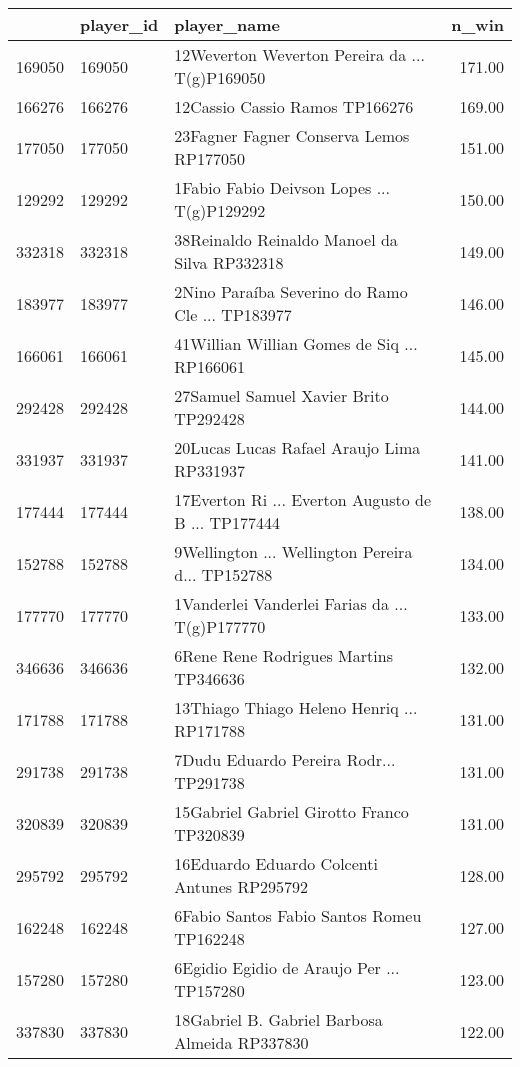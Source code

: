 \begin{table}[ht]
\centering
\begin{tabular}{rllr}
  \hline
 & player\_id & player\_name & n\_win \\ 
  \hline
169050 & 169050 & 12Weverton Weverton Pereira da ... T(g)P169050 & 171.00 \\ 
  166276 & 166276 & 12Cassio Cassio Ramos TP166276 & 169.00 \\ 
  177050 & 177050 & 23Fagner Fagner Conserva Lemos RP177050 & 151.00 \\ 
  129292 & 129292 & 1Fabio Fabio Deivson Lopes  ... T(g)P129292 & 150.00 \\ 
  332318 & 332318 & 38Reinaldo Reinaldo Manoel da Silva RP332318 & 149.00 \\ 
  183977 & 183977 & 2Nino Paraíba Severino do Ramo Cle ... TP183977 & 146.00 \\ 
  166061 & 166061 & 41Willian Willian Gomes de Siq ... RP166061 & 145.00 \\ 
  292428 & 292428 & 27Samuel Samuel Xavier Brito TP292428 & 144.00 \\ 
  331937 & 331937 & 20Lucas Lucas Rafael Araujo Lima RP331937 & 141.00 \\ 
  177444 & 177444 & 17Everton Ri ... Everton Augusto de B ... TP177444 & 138.00 \\ 
  152788 & 152788 & 9Wellington ... Wellington Pereira d... TP152788 & 134.00 \\ 
  177770 & 177770 & 1Vanderlei Vanderlei Farias da  ... T(g)P177770 & 133.00 \\ 
  346636 & 346636 & 6Rene Rene Rodrigues Martins TP346636 & 132.00 \\ 
  171788 & 171788 & 13Thiago Thiago Heleno Henriq ... RP171788 & 131.00 \\ 
  291738 & 291738 & 7Dudu Eduardo Pereira Rodr... TP291738 & 131.00 \\ 
  320839 & 320839 & 15Gabriel Gabriel Girotto Franco TP320839 & 131.00 \\ 
  295792 & 295792 & 16Eduardo Eduardo Colcenti Antunes RP295792 & 128.00 \\ 
  162248 & 162248 & 6Fabio Santos Fabio Santos Romeu TP162248 & 127.00 \\ 
  157280 & 157280 & 6Egidio Egidio de Araujo Per ... TP157280 & 123.00 \\ 
  337830 & 337830 & 18Gabriel B. Gabriel Barbosa Almeida RP337830 & 122.00 \\ 
   \hline
\end{tabular}
\end{table}
